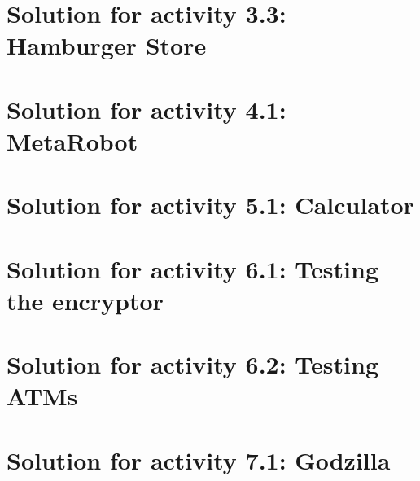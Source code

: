 \newpage
\section{Solution for activity  3.3: Hamburger Store}



\newpage
\section{Solution for activity  4.1: MetaRobot}



\newpage
\section{Solution for activity  5.1: Calculator}



\newpage
\section{Solution for activity  6.1: Testing the encryptor}




\newpage
\section{Solution for activity  6.2: Testing ATMs}



\newpage
\section{Solution for activity  7.1: Godzilla}

\newpage
